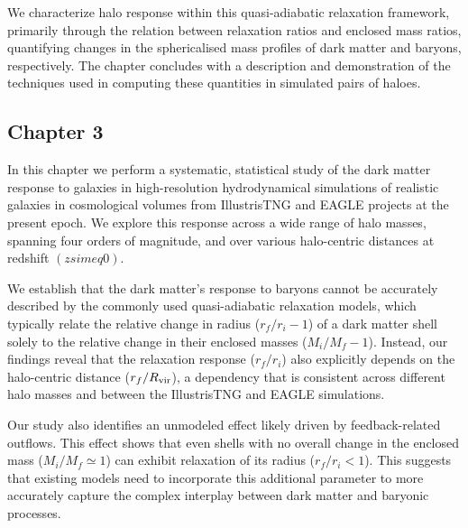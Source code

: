 \documentclass[a4paper, 12pt, oneside]{Thesis}  %
\begin{document}
We characterize halo response within this quasi-adiabatic relaxation framework, primarily through the relation between relaxation ratios and enclosed mass ratios, quantifying changes in the sphericalised mass profiles of dark matter and baryons, respectively. The chapter concludes with a description and demonstration of the techniques used in computing these quantities in simulated pairs of haloes.



\subsection*{Chapter 3}

In this chapter we perform a systematic, statistical study of the dark matter response to galaxies in high-resolution hydrodynamical simulations of realistic galaxies in cosmological volumes from IllustrisTNG and EAGLE projects at the present epoch.
% 
% 
% 
% 
We explore this response across a wide range of halo masses, spanning four orders of magnitude, and over various halo-centric distances at redshift $(z simeq 0)$.

We establish that the dark matter's response to baryons cannot be accurately described by the commonly used quasi-adiabatic relaxation models, which typically relate the relative change in radius (\(r_f/r_i-1\)) of a dark matter shell solely to the relative change in their enclosed masses (\(M_i/M_f-1\)). Instead, our findings reveal that the relaxation response (\(r_f/r_i\)) also explicitly depends on the halo-centric distance (\(r_f/R_{\rm vir}\)), a dependency that is consistent across different halo masses and between the IllustrisTNG and EAGLE simulations.

Our study also identifies an unmodeled effect likely driven by feedback-related outflows. This effect shows that even shells with no overall change in the enclosed mass (\(M_i/M_f \simeq 1\))  can exhibit relaxation of its radius (\(r_f/r_i < 1\)). This suggests that existing models need to incorporate this additional parameter to more accurately capture the complex interplay between dark matter and baryonic processes.
\end{document}
